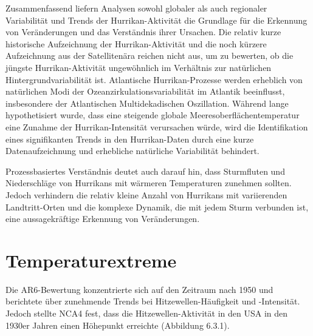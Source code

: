 \documentclass[12pt,paper=a4,DIV=12,parskip=never,chapterprefix=false,headings=standardclasses]{scrreprt}
\begin{document}
Zusammenfassend liefern Analysen sowohl globaler als auch regionaler Variabilität und Trends der Hurrikan-Aktivität die Grundlage für die Erkennung von Veränderungen und das Verständnis ihrer Ursachen. Die relativ kurze historische Aufzeichnung der Hurrikan-Aktivität und die noch kürzere Aufzeichnung aus der Satellitenära reichen nicht aus, um zu bewerten, ob die jüngste Hurrikan-Aktivität ungewöhnlich im Verhältnis zur natürlichen Hintergrundvariabilität ist. Atlantische Hurrikan-Prozesse werden erheblich von natürlichen Modi der Ozeanzirkulationsvariabilität im Atlantik beeinflusst, insbesondere der Atlantischen Multidekadischen Oszillation. Während lange hypothetisiert wurde, dass eine steigende globale Meeresoberflächentemperatur eine Zunahme der Hurrikan-Intensität verursachen würde, wird die Identifikation eines signifikanten Trends in den Hurrikan-Daten durch eine kurze Datenaufzeichnung und erhebliche natürliche Variabilität behindert.

Prozessbasiertes Verständnis deutet auch darauf hin, dass Sturmfluten und Niederschläge von Hurrikans mit wärmeren Temperaturen zunehmen sollten. Jedoch verhindern die relativ kleine Anzahl von Hurrikans mit variierenden Landtritt-Orten und die komplexe Dynamik, die mit jedem Sturm verbunden ist, eine aussagekräftige Erkennung von Veränderungen.

\section{Temperaturextreme}
Die AR6-Bewertung konzentrierte sich auf den Zeitraum nach 1950 und berichtete über zunehmende Trends bei Hitzewellen-Häufigkeit und -Intensität. Jedoch stellte NCA4 fest, dass die Hitzewellen-Aktivität in den USA in den 1930er Jahren einen Höhepunkt erreichte (Abbildung 6.3.1).
\end{document}
